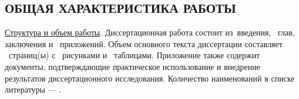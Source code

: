 
%
%
%
%


\setcounter{page}{3}

\subsection*{\MakeUppercase{Общая характеристика работы}}




\underline{Структура и объем работы}. Диссертационная работа состоит
из~введения, \themychapters~глав, заключения
и \themyappendices~приложений. Объем основного текста диссертации
составляет \themypages~страниц(ы) с \themyfigures~рисунками
и \themytables~таблицами. Приложение также содержит документы,
подтверждающие практическое использование и внедрение результатов
диссертационного исследования. Количество наименований в списке
литературы --- \themybibitems.
